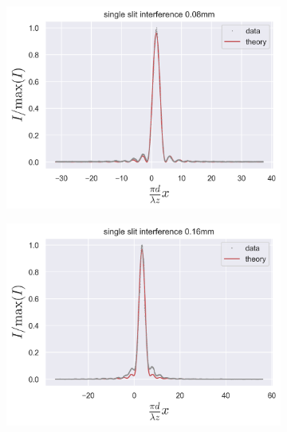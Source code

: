 \begin{figure}[H]
	\centering
	\begin{subfigure}{0.5\columnwidth}
		\centering
		\includegraphics[width=\columnwidth]{figures/single slit interference 0.08mm.png} %
		\caption{}
        \label{fig:single slit interference 0.08mm}
	\end{subfigure}\hfill
    \begin{subfigure}{0.5\columnwidth}
        \centering
        \includegraphics[width=\columnwidth]{figures/single slit interference 0.16mm.png} %
        \caption{}
        \label{fig:single slit interference 0.16mm}
    \end{subfigure}
    \begin{subfigure}{0.5\columnwidth}

\end{subfigure}
\end{figure}
